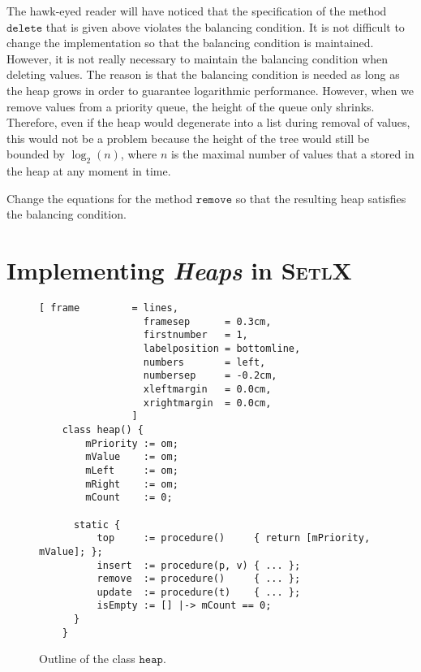 The hawk-eyed reader will have noticed that the specification of the method $\mathtt{delete}$ that is given
above violates the balancing condition.  It is not difficult to change the implementation so that
the balancing condition is maintained.  However, it is not really necessary to maintain the
balancing condition when deleting values.  The reason is that the balancing condition is needed as
long as the heap grows in order to guarantee logarithmic  performance.  However, when we remove
values from a priority queue, the height of the queue only shrinks.  Therefore, even if the heap
would degenerate into a list during removal of values, this would not be a problem because the
height of the tree would still be bounded by $\log_2(n)$, where $n$ is the maximal number of
values that a stored in the heap at any moment in time.

\exercise
Change the equations for the method $\mathtt{remove}$ so that the resulting heap satisfies the
balancing condition.



\section[Implementation]{Implementing \textsl{Heaps} in \textsc{SetlX}}

\begin{figure}[bt]
\centering
\begin{Verbatim}[ frame         = lines, 
                  framesep      = 0.3cm, 
                  firstnumber   = 1,
                  labelposition = bottomline,
                  numbers       = left,
                  numbersep     = -0.2cm,
                  xleftmargin   = 0.0cm,
                  xrightmargin  = 0.0cm,
                ]
    class heap() {
        mPriority := om;
        mValue    := om;
        mLeft     := om;
        mRight    := om;
        mCount    := 0;
    
      static {
          top     := procedure()     { return [mPriority, mValue]; };
          insert  := procedure(p, v) { ... };
          remove  := procedure()     { ... };
          update  := procedure(t)    { ... };
          isEmpty := [] |-> mCount == 0;
      }
    }
\end{Verbatim}
\vspace*{-0.3cm}
\caption{Outline of the class $\mathtt{heap}$.}
\label{fig:heap.stlx-outline}
\end{figure}

